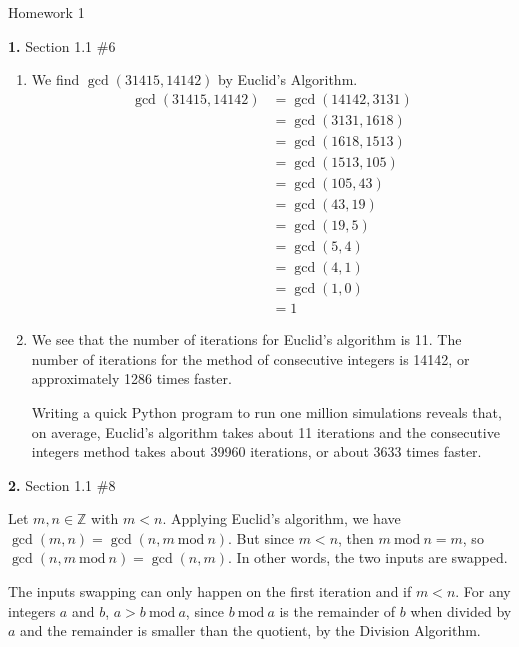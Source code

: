 \documentclass[letterpaper, 11pt]{article}
\newcommand{\Z}{\mathbb{Z}}
\newcommand{\hwnumber}[3]{\medskip \noindent\textbf{#1.} Section #2 \##3 \smallskip}
\newcommand{\Mod}[1]{\ \mathrm{mod}\ #1}
\begin{document}
\begin{center}
	{\LARGE Homework 1}\\
\end{center}

\hwnumber{1}{1.1}{6}

\begin{enumerate}[label = (\alph*)]
  \item We find $\gcd(31415, 14142)$ by Euclid's Algorithm.
    \begin{align*}
      \gcd(31415, 14142) &= \gcd(14142, 3131)\\
                         &= \gcd(3131, 1618)\\
                         &= \gcd(1618, 1513)\\
                         &= \gcd(1513, 105)\\
                         &= \gcd(105, 43)\\
                         &= \gcd(43, 19)\\
                         &= \gcd(19, 5)\\
                         &= \gcd(5, 4)\\
                         &= \gcd(4, 1)\\
                         &= \gcd(1, 0)\\
                         &= 1
    \end{align*}

  \item We see that the number of iterations for Euclid's algorithm is 11. The
    number of iterations for the method of consecutive integers is 14142, or
    approximately 1286 times faster. 

    Writing a quick Python program to run one million simulations reveals that,
    on average, Euclid's algorithm takes about 11 iterations and the consecutive
    integers method takes about 39960 iterations, or about 3633 times faster.
\end{enumerate}

\hwnumber{2}{1.1}{8}

Let $m, n \in \Z$ with $m < n$. Applying Euclid's algorithm, we have $\gcd(m, n)
= \gcd(n, m \Mod{n})$. But since $m < n$, then $m \Mod{n} = m$, so $\gcd(n, m
\Mod{n}) = \gcd(n, m)$. In other words, the two inputs are swapped. 

The inputs swapping can only happen on the first iteration and if $m < n$. For
any integers $a$ and $b$, $a > b \Mod{a}$, since $b \Mod{a}$ is the
remainder of $b$ when divided by $a$ and the remainder is smaller than the
quotient, by the Division Algorithm. 
\end{document}
